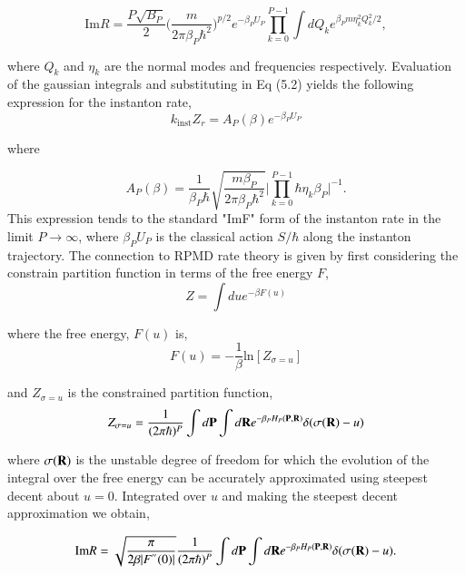 \documentclass[phd,tocprelim]{cornell}
\begin{document}
 \begin{equation}
 \textrm{Im} R = \frac{P\sqrt{B_P}}{2}\bigg( \frac{m}{2\pi\beta_P \hbar^2}\bigg)^{p/2} e^{-\beta_P U_P} \prod_{k=0}^{P-1} \int dQ_k e^{\beta_P m \eta_k^2 Q_k^2/2},
 \end{equation}
 
 
 where $Q_k$ and $\eta_k$ are the normal modes and frequencies respectively. Evaluation of the gaussian integrals and substituting in Eq (5.2) yields the following expression for the instanton rate,
 \begin{equation}
 k_{\textrm{inst}}Z_r = A_P(\beta) e^{-\beta_P U_P}
 \end{equation}
 
 where

 \begin{equation}
 A_P(\beta) = \frac{1}{\beta_P \hbar} \sqrt{\frac{m\beta_P}{2\pi \beta_P \hbar^2}} \bigg| \prod_{k=0}^{P-1} \hbar \eta_k \beta_P \bigg|^{-1}.
 \end{equation}
 This expression tends to the standard "ImF" form of the instanton rate in the limit $P\to \infty$, where $\beta_P U_P$ is the classical action $ S/\hbar$ along the instanton trajectory.  
 The connection to RPMD rate theory is given by first considering the constrain partition function in terms of the free energy $F$,
 \begin{equation}
 Z= \int du e^{-\beta F(u)} 
 \end{equation}
 
 where the free energy, $F(u)$ is,
  \begin{equation}
  F(u)=-\frac{1}{\beta} \textrm{ln} [Z_{\sigma=u}]
  \end{equation} 
  
  and $Z_{\sigma=u}$ is the constrained partition function, 
\begin{equation}
Z_{\sigma=u}  = \frac{1}{(2\pi \hbar)^P} \int d {\bf{P}}  \int d {\bf{R}} e^{-\beta_P H_P( {\bf{P}}, {\bf{R}})} \delta(\sigma( {\bf{R}})-u)
  \end{equation}    
  
  where $ \sigma( {\bf{R}})$ is the unstable degree of freedom for which the evolution of the integral over the free energy can be accurately approximated using steepest decent about $u=0$. Integrated over $u$ and making the steepest decent approximation we obtain, 
  
\begin{equation}
 \textrm{Im} R =\sqrt{\frac{\pi}{2\beta |F^{''}(0)|}} \frac{1}{(2\pi \hbar)^P} \int d {\bf{P}}  \int d {\bf{R}} e^{-\beta_P H_P( {\bf{P}}, {\bf{R}})} \delta(\sigma( {\bf{R}})-u).
 \end{equation}  
   
\end{document}

